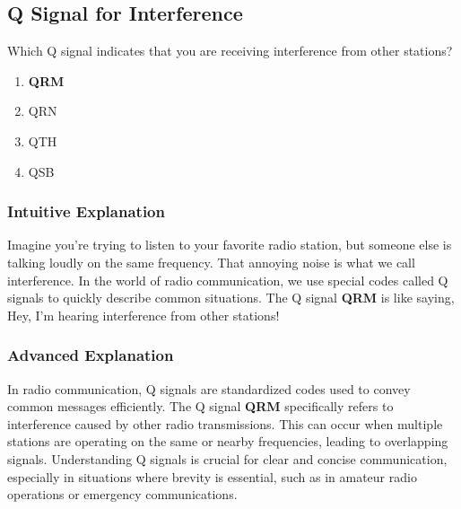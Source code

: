 \subsection{Q Signal for Interference}
\label{T2B10}

\begin{tcolorbox}[colback=gray!10!white,colframe=black!75!black,title=T2B10]
Which Q signal indicates that you are receiving interference from other stations?
\begin{enumerate}[noitemsep]
    \item \textbf{QRM}
    \item QRN
    \item QTH
    \item QSB
\end{enumerate}
\end{tcolorbox}

\subsubsection*{Intuitive Explanation}
Imagine you're trying to listen to your favorite radio station, but someone else is talking loudly on the same frequency. That annoying noise is what we call interference. In the world of radio communication, we use special codes called Q signals to quickly describe common situations. The Q signal \textbf{QRM} is like saying, Hey, I'm hearing interference from other stations!

\subsubsection*{Advanced Explanation}
In radio communication, Q signals are standardized codes used to convey common messages efficiently. The Q signal \textbf{QRM} specifically refers to interference caused by other radio transmissions. This can occur when multiple stations are operating on the same or nearby frequencies, leading to overlapping signals. Understanding Q signals is crucial for clear and concise communication, especially in situations where brevity is essential, such as in amateur radio operations or emergency communications.